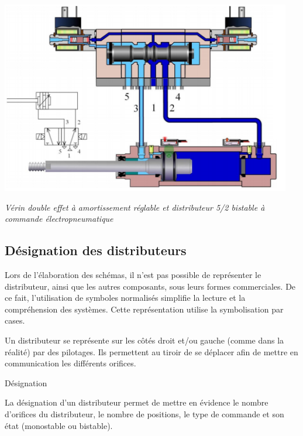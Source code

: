 \begin{center}
\includegraphics[width=5in]{media/image114.png}

\emph{Vérin double effet à amortissement réglable et distributeur 5/2
bistable à commande électropneumatique} 
\end{center}


\subsection{Désignation des distributeurs}

Lors de l'élaboration des schémas, il n'est pas possible de représenter
le distributeur, ainsi que les autres composants, sous leurs formes
commerciales. De ce fait, l'utilisation de symboles normalisés simplifie
la lecture et la compréhension des systèmes. Cette représentation
utilise la symbolisation par cases.

Un distributeur se représente sur les côtés droit et/ou gauche (comme
dans la réalité) par des pilotages. Ils permettent au tiroir de se
déplacer afin de mettre en communication les différents orifices.



\begin{defi}{Désignation}

La désignation d'un distributeur permet de mettre en évidence le nombre
d'orifices du distributeur, le nombre de positions, le type de commande
et son état (monostable ou bistable). 
\end{defi}

